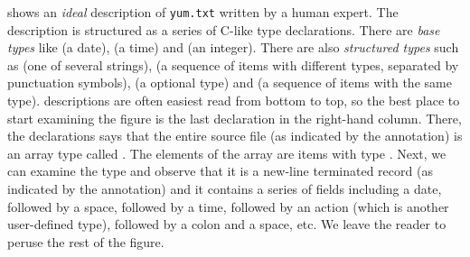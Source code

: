  shows an {\em ideal} \pads{} description of
{\tt yum.txt} written by a human expert.  The description is
structured as a series of C-like type declarations.  There
are {\em base types} like  (a date),
 (a time) and  (an integer).
There are also {\em structured types} such as
 (one of several strings), 
(a sequence of items with different types, 
separated by punctuation symbols),  
(a optional type) and  (a sequence of
items with the same type).  \pads{} descriptions
are often easiest read from bottom to top,
so the best place to start examining the figure
is the last declaration in the right-hand column.
There, the declarations says that the entire
source file (as indicated by the  
annotation) is an array type called .
The elements of the array are items with
type .  Next, we can examine
the type  and observe that it
is a new-line terminated 
record (as indicated by the 
annotation) and it contains a series of fields
including a date, followed by a space, followed
by a time, followed by an action (which is another
user-defined type), followed by a colon and a
space, etc. We leave the reader to peruse the
rest of the figure.

